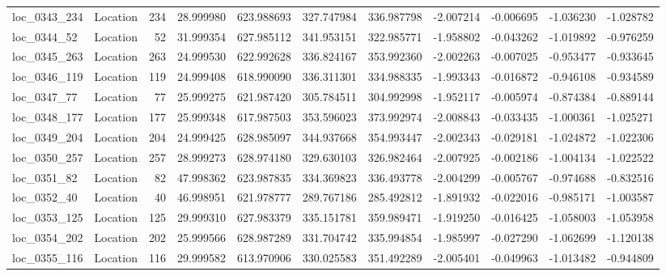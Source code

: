 \begin{tabular}{llrrrrrrrrr}
 loc_0343_234 &        Location &             234 &  28.999980 & 623.988693 &  327.747984 &    336.987798 &  -2.007214 &  -0.006695 &   -1.036230 &     -1.028782 \\
  loc_0344_52 &        Location &              52 &  31.999354 & 627.985112 &  341.953151 &    322.985771 &  -1.958802 &  -0.043262 &   -1.019892 &     -0.976259 \\
 loc_0345_263 &        Location &             263 &  24.999530 & 622.992628 &  336.824167 &    353.992360 &  -2.002263 &  -0.007025 &   -0.953477 &     -0.933645 \\
 loc_0346_119 &        Location &             119 &  24.999408 & 618.990090 &  336.311301 &    334.988335 &  -1.993343 &  -0.016872 &   -0.946108 &     -0.934589 \\
  loc_0347_77 &        Location &              77 &  25.999275 & 621.987420 &  305.784511 &    304.992998 &  -1.952117 &  -0.005974 &   -0.874384 &     -0.889144 \\
 loc_0348_177 &        Location &             177 &  25.999348 & 617.987503 &  353.596023 &    373.992974 &  -2.008843 &  -0.033435 &   -1.000361 &     -1.025271 \\
 loc_0349_204 &        Location &             204 &  24.999425 & 628.985097 &  344.937668 &    354.993447 &  -2.002343 &  -0.029181 &   -1.024872 &     -1.022306 \\
 loc_0350_257 &        Location &             257 &  28.999273 & 628.974180 &  329.630103 &    326.982464 &  -2.007925 &  -0.002186 &   -1.004134 &     -1.022522 \\
  loc_0351_82 &        Location &              82 &  47.998362 & 623.987835 &  334.369823 &    336.493778 &  -2.004299 &  -0.005767 &   -0.974688 &     -0.832516 \\
  loc_0352_40 &        Location &              40 &  46.998951 & 621.978777 &  289.767186 &    285.492812 &  -1.891932 &  -0.022016 &   -0.985171 &     -1.003587 \\
 loc_0353_125 &        Location &             125 &  29.999310 & 627.983379 &  335.151781 &    359.989471 &  -1.919250 &  -0.016425 &   -1.058003 &     -1.053958 \\
 loc_0354_202 &        Location &             202 &  25.999566 & 628.987289 &  331.704742 &    335.994854 &  -1.985997 &  -0.027290 &   -1.062699 &     -1.120138 \\
 loc_0355_116 &        Location &             116 &  29.999582 & 613.970906 &  330.025583 &    351.492289 &  -2.005401 &  -0.049963 &   -1.013482 &     -0.944809 \\

\end{tabular}
